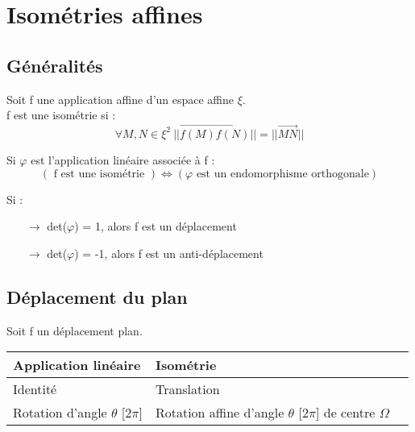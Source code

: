 \section{Isométries affines}
\subsection{Généralités}
\begin{de}
Soit f une application affine d'un espace affine $\xi$.\\
f est une isométrie si : 
$$\forall M,N \in \xi^2~ ||\overrightarrow{f(M)f(N)}|| = ||\overrightarrow{MN}||$$
\end{de}
\begin{prop}
Si $\varphi$ est l'application linéaire associée à f :
$$(\mbox{ f est une isométrie }) \Leftrightarrow (\varphi \mbox{ est un endomorphisme orthogonale})$$
\end{prop}
\begin{voc}
Si : 
\begin{itemize}
 \item[$\rightarrow$] det($\varphi$) = 1, alors f est un déplacement 
 \item[$\rightarrow$] det($\varphi$) = -1, alors f est un anti-déplacement
\end{itemize}
\end{voc}
\subsection{Déplacement du plan}
Soit f un déplacement plan.
\begin{center}
\begin{tabular}{|l|l|l|}
\hline
Application linéaire & Isométrie \\ \hline
Identité & Translation \\ \hline
Rotation d'angle $\theta$ [2$\pi$] & Rotation affine d'angle $\theta$ [2$\pi$] de centre $\Omega$ \\ \hline
\end{tabular}
\end{center}
